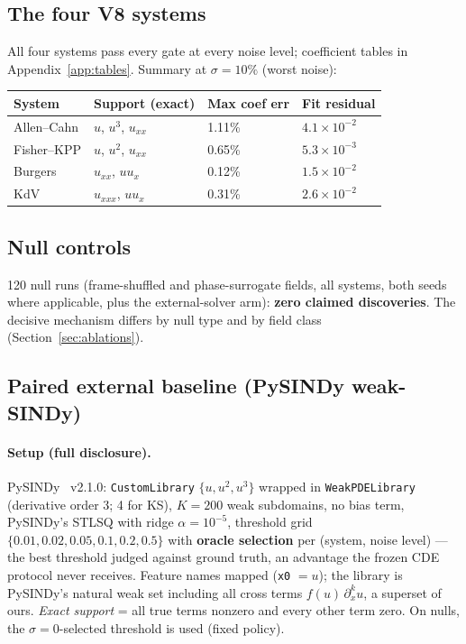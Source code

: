 \documentclass[11pt]{article}
\begin{document}
\subsection{The four V8 systems}
All four systems pass every gate at every noise level; coefficient tables in
Appendix~\ref{app:tables}. Summary at $\sigma = 10\%$ (worst noise):
\begin{center}\small
\begin{tabular}{llll}
\toprule
System & Support (exact) & Max coef err & Fit residual \\
\midrule
Allen–Cahn & $u$, $u^3$, $u_{xx}$ & 1.11\% & $4.1 \times 10^{-2}$ \\
Fisher–KPP & $u$, $u^2$, $u_{xx}$ & 0.65\% & $5.3 \times 10^{-3}$ \\
Burgers & $u_{xx}$, $u u_x$ & 0.12\% & $1.5 \times 10^{-2}$ \\
KdV & $u_{xxx}$, $u u_x$ & 0.31\% & $2.6 \times 10^{-2}$ \\
\bottomrule
\end{tabular}
\end{center}

\subsection{Null controls}
120 null runs (frame-shuffled and phase-surrogate fields, all
systems, both seeds where applicable, plus the external-solver arm):
\textbf{zero claimed discoveries}. The decisive mechanism differs by null
type and by field class (Section~\ref{sec:ablations}).

\subsection{Paired external baseline (PySINDy weak-SINDy)}
\paragraph{Setup (full disclosure).} PySINDy~\cite{desilva2020,kaptanoglu2022} v2.1.0: \texttt{CustomLibrary} $\{u, u^2, u^3\}$ wrapped in \texttt{WeakPDELibrary} (derivative order 3; 4 for KS), $K = 200$ weak subdomains, no bias term, PySINDy's STLSQ with ridge $\alpha = 10^{-5}$, threshold grid $\{0.01, 0.02, 0.05, 0.1, 0.2, 0.5\}$ with \textbf{oracle selection} per (system, noise level) --- the best threshold judged against ground truth, an advantage the frozen CDE protocol never receives. Feature names mapped (\texttt{x0} $= u$); the library is PySINDy's natural weak set including all cross terms $f(u)\,\partial_x^k u$, a superset of ours. \emph{Exact support} = all true terms nonzero and every other term zero. On nulls, the $\sigma = 0$-selected threshold is used (fixed policy).
\end{document}
